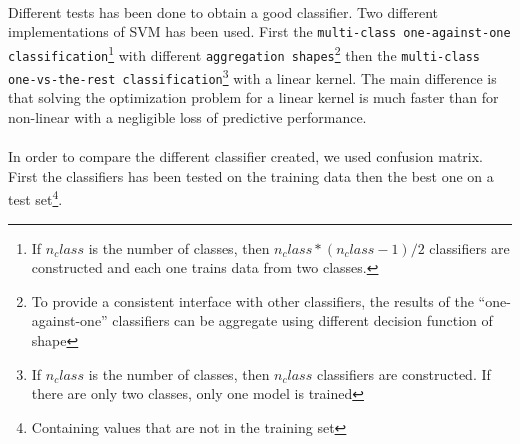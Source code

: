 \paragraph{}
Different tests has been done to obtain a good classifier. Two different implementations of SVM has been used. First the \texttt{multi-class one-against-one classification}\footnote{If $n_class$ is the number of classes, then $n_class * (n_class - 1) / 2$ classifiers are constructed and each one trains data from two classes.} with different \texttt{aggregation shapes}\footnote{To provide a consistent interface with other classifiers, the results of the “one-against-one” classifiers can be aggregate using different decision function of shape} then the \texttt{multi-class one-vs-the-rest classification}\footnote{If $n_class$ is the number of classes, then $n_class$ classifiers are constructed. If there are only two classes, only one model is trained} with a linear kernel\cite{bib:misc:5}. The main difference is that solving the optimization problem for a linear kernel is much faster than for non-linear with a negligible loss of predictive performance\cite{bib:article:1}.

\paragraph{}
In order to compare the different classifier created, we used confusion matrix. First the classifiers has been tested on the training data then the best one on a test set\footnote{Containing values that are not in the training set}. 

